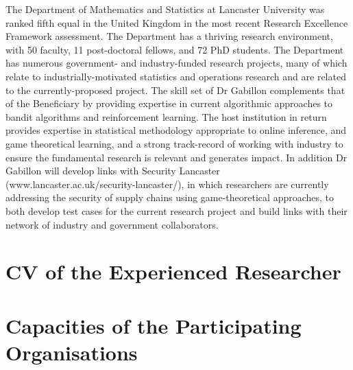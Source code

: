 \documentclass[a4paper,11pt]{article}
\begin{document}
The Department of Mathematics and Statistics at Lancaster University was ranked fifth equal in the United Kingdom in the most recent Research Excellence Framework assessment.  The Department has a thriving research environment, with 50 faculty, 11 post-doctoral fellows, and 72 PhD students.  The Department has numerous government- and industry-funded research projects, many of which relate to industrially-motivated statistics and operations research and are related to the currently-proposed project.  The skill set of Dr Gabillon complements that of the Beneficiary by providing expertise in current algorithmic approaches to bandit algorithms and reinforcement learning.  The host institution in return provides expertise in statistical methodology appropriate to online inference, and game theoretical learning, and a strong track-record of working with industry to ensure the fundamental research is relevant and generates impact.  In addition Dr Gabillon will develop links with Security Lancaster (www.lancaster.ac.uk/security-lancaster/), in which researchers are currently addressing the security of supply chains using game-theoretical approaches, to both develop test cases for the current research project and build links with their network of industry and government collaborators.

\newpage
\section{CV of the Experienced Researcher}
\label{sec:cv}



\newpage
\section{Capacities of the Participating Organisations}
\label{sec:capacities}

\vspace{\baselineskip}
\end{document}
